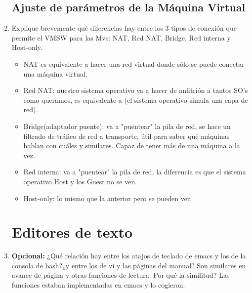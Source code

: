 \documentclass[paper=a4, fontsize=11pt]{scrartcl} %
\numberwithin{equation}{section} %
\numberwithin{figure}{section} %
\numberwithin{table}{section} %
\begin{document}
\begin{enumerate}
	\subsection{Ajuste de parámetros de la Máquina Virtual}
		\item Explique brevemente qué diferencias hay entre los 3 tipos de conexión que permite el
		VMSW para las Mvs: NAT, Red NAT, Bridge, Red interna y Host-only.
		\begin{itemize}
			\item NAT es equivalente a hacer una red virtual donde sólo se puede conectar una máquina
			virtual.
			\item Red NAT: nuestro sistema operativo va a hacer de anfitrión a tantos SO's como
			queramos, es equivalente a (el sistema operativo simula una capa de red).
			\item Bridge(adaptador puente): va a "puentear" la pila de red, se hace un filtrado de
			tráfico de red a transporte, útil para saber qué máquinas hablan con cuáles y similares.
			Capaz de tener más de una máquina a la vez.
			\item Red interna: va a "puentear" la pila de red, la diferencia es que el sistema operativo
			Host y los Guest no se ven.
			\item Host-only: lo mismo que la anterior pero se pueden ver.
		\end{itemize}
		
	\section{Editores de texto}
		\item \textbf{Opcional:} ¿Qué relación hay entre los atajos de teclado de emacs y los de
		la consola de bash?¿y entre los de vi y las páginas del manual?
		Son similares en avance de página y otras funciones de lectura. Por qué la similitud? Las
		funciones estaban implementadas en emacs y lo cogieron.
		
		
\end{enumerate}


\newpage
\end{document}
